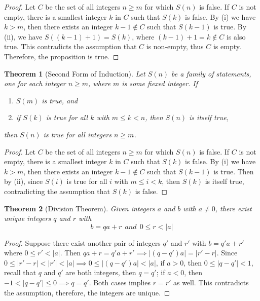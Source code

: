 \documentclass{article}
\newtheorem{theorem}{Theorem}[section]
\begin{document}
    \begin{proof}
        Let \(C\) be the set of all integers \(n \geq m\) for which \(S(n)\) is false. 
        If \(C\) is not empty, there is a smallest integer \(k\) in \(C\) such that \(S(k)\) 
        is false. By (i) we have \(k > m\), then there exists an integer \(k-1 \notin C\) 
        such that \(S(k-1)\) is true. By (ii), we have \(S((k-1)+1)=S(k)\), where \((k-1)+1=k \notin C\)
        is also true. This contradicts the assumption that \(C\) is non-empty, thus \(C\)
        is empty. Therefore, the proposition is true. 
    \end{proof}
    \begin{theorem}[Second Form of Induction]
        Let \(S(n)\) be a family of statements, one for each integer \(n \geq m\), where 
        \(m\) is some fiexed integer. If 
        \begin{enumerate}
            \item \(S(m)\) is true, and
            \item if \(S(k)\) is true for all \(k\) with \(m \leq k < n\), then \(S(n)\) is itself true,
        \end{enumerate}
        then \(S(n)\) is true for all integers \(n \geq m\).
    \end{theorem}
    \begin{proof}
        Let \(C\) be the set of all integers \(n \geq m\) for which \(S(n)\) is false. 
        If \(C\) is not empty, there is a smallest integer \(k\) in \(C\) such that \(S(k)\) 
        is false. By (i) we have \(k > m\), then there exists an integer \(k-1 \notin C\) 
        such that \(S(k-1)\) is true. Then by (ii), since \(S(i)\) is true for all \(i\) 
        with \(m \leq i < k\), then \(S(k)\) is itself true, contradicting the assumption 
        that \(S(k)\) is false.
    \end{proof}
    \begin{theorem}[Division Theorem]
        Given integers \(a\) and \(b\) with \(a \neq 0\), there exist unique integers 
        \(q\) and \(r\) with \[b=qa+r \ \ and \ \ 0 \leq r < |a|\]
    \end{theorem}
    \begin{proof}
        Suppose there exist another pair of integers \(q'\) and \(r'\) with \(b=q'a+r'\) 
        where \(0 \leq r' < |a|\). Then \(qa+r=q'a+r' \implies |(q-q')a|=|r'-r|\). 
        Since \(0 \leq |r'-r| < |r'| < |a| \implies 0 \leq |(q-q')a| < |a|\), if \(a>0\), 
        then \(0 \leq |q-q'| < 1\), recall that \(q\) and \(q'\) are both integers, 
        then \(q=q'\); if \(a<0\), then \(-1 < |q-q'| \leq 0 \implies q=q'\). Both cases 
        implies \(r=r'\) as well. This contradicts the assumption, therefore, the integers 
        are unique.
    \end{proof}
\end{document}
